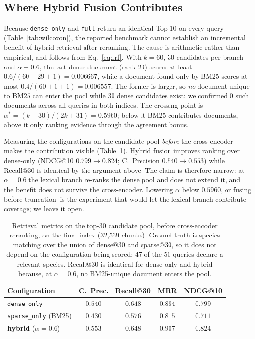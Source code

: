 \documentclass[runningheads]{llncs}
\begin{document}
\subsection{Where Hybrid Fusion Contributes}
\label{sec:pool}

Because \texttt{dense\_only} and \texttt{full} return an identical Top-10 on every query
(Table~\ref{tab:wilcoxon}), the reported benchmark cannot establish an incremental
benefit of hybrid retrieval after reranking. The cause is arithmetic rather than
empirical, and follows from Eq.~\ref{eq:rrf}. With $k{=}60$, 30 candidates per branch and
$\alpha{=}0.6$, the last dense document (rank 29) scores at least $0.6/(60{+}29{+}1)=0.006667$,
while a document found only by BM25 scores at most $0.4/(60{+}0{+}1)=0.006557$. The former is
larger, so \emph{no} document unique to BM25 can enter the pool while 30 dense
candidates exist: we confirmed $0$ such documents across all queries in both indices.
The crossing point is $\alpha^\ast = (k{+}30)/(2k{+}31) = 0.5960$; below it BM25
contributes documents, above it only ranking evidence through the agreement bonus.

Measuring the configurations on the candidate pool \emph{before} the cross-encoder makes
the contribution visible (Table~\ref{tab:pool}). Hybrid fusion improves ranking over
dense-only (NDCG@10 $0.799 \rightarrow 0.824$; C.\ Precision $0.540 \rightarrow
0.553$) while Recall@30 is identical by the argument above. The claim is therefore
narrow: at $\alpha{=}0.6$ the lexical branch re-ranks the dense pool and does not
extend it, and the benefit does not survive the cross-encoder. Lowering $\alpha$ below $0.5960$, or fusing before truncation, is the
experiment that would let the lexical branch contribute coverage; we leave it open.

\begin{table}[!ht]
\centering
\caption{Retrieval metrics on the top-30 candidate pool, before cross-encoder
reranking, on the final index (32,569 chunks). Ground truth is species matching over the union of
dense@30 and sparse@30, so it does not depend on the configuration being scored; 47 of
the 50 queries declare a relevant species. Recall@30 is identical for dense-only and
hybrid because, at $\alpha{=}0.6$, no BM25-unique document enters the pool.}
\label{tab:pool}
\footnotesize
\begin{tabular}{l c c c c}
\toprule
\textbf{Configuration} & \textbf{C.\ Prec.} & \textbf{Recall@30} & \textbf{MRR} & \textbf{NDCG@10} \\
\midrule
\texttt{dense\_only}          & $0.540$ & $0.648$ & $0.884$ & $0.799$ \\
\texttt{sparse\_only} (BM25)  & $0.430$ & $0.576$ & $0.815$ & $0.711$ \\
\textbf{hybrid} ($\alpha{=}0.6$) & $\mathbf{0.553}$ & $0.648$ & $\mathbf{0.907}$ & $\mathbf{0.824}$ \\
\bottomrule
\end{tabular}
\end{table}
\end{document}
